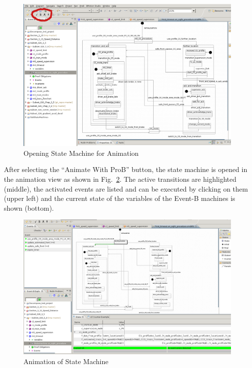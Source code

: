 \documentclass{template/openetcs_article}
\begin{document}
\begin{figure}[H]
  \centering
  \includegraphics[width=.95\textwidth]{StateMachine1}
  \caption{Opening State Machine for Animation}
  \label{fig:statemachine-anim}
\end{figure}

After selecting the ``Animate With ProB'' button, the state machine is opened in
the animation view as shown in Fig.~\ref{fig:animation-machine}. The active
transitions are highlighted (middle), the activated events are listed and can be executed
by clicking on them (upper left) and the current state of the variables of the
Event-B machines is shown (bottom).

\begin{figure}[H]
  \centering
  \includegraphics[width=.95\textwidth]{StateMachine2}
  \caption{Animation of State Machine}
  \label{fig:animation-machine}
\end{figure}
\end{document}
